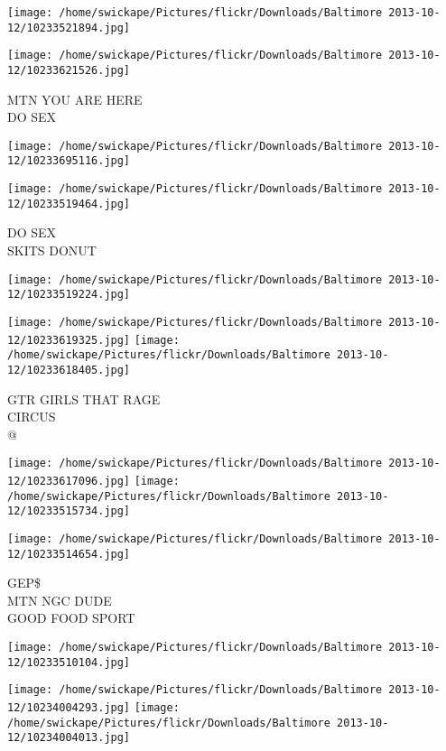 \documentclass[10pt,letterpaper]{article}
\begin{document}
\texttt{[image: /home/swickape/Pictures/flickr/Downloads/Baltimore 2013-10-12/10233521894.jpg]}

\vspace{0.25in}
\texttt{[image: /home/swickape/Pictures/flickr/Downloads/Baltimore 2013-10-12/10233621526.jpg]}

MTN YOU ARE HERE\\
DO SEX
\pagebreak

\texttt{[image: /home/swickape/Pictures/flickr/Downloads/Baltimore 2013-10-12/10233695116.jpg]}

\vspace{0.25in}
\texttt{[image: /home/swickape/Pictures/flickr/Downloads/Baltimore 2013-10-12/10233519464.jpg]}

DO SEX\\
SKITS DONUT
\pagebreak

\texttt{[image: /home/swickape/Pictures/flickr/Downloads/Baltimore 2013-10-12/10233519224.jpg]}

\vspace{0.25in}
\texttt{[image: /home/swickape/Pictures/flickr/Downloads/Baltimore 2013-10-12/10233619325.jpg]}
\texttt{[image: /home/swickape/Pictures/flickr/Downloads/Baltimore 2013-10-12/10233618405.jpg]}

GTR GIRLS THAT RAGE\\
CIRCUS\\
@
\pagebreak

\texttt{[image: /home/swickape/Pictures/flickr/Downloads/Baltimore 2013-10-12/10233617096.jpg]}
\texttt{[image: /home/swickape/Pictures/flickr/Downloads/Baltimore 2013-10-12/10233515734.jpg]}

\vspace{0.25in}
\texttt{[image: /home/swickape/Pictures/flickr/Downloads/Baltimore 2013-10-12/10233514654.jpg]}

GEP\$\\
MTN NGC DUDE\\
GOOD FOOD SPORT
\pagebreak

\texttt{[image: /home/swickape/Pictures/flickr/Downloads/Baltimore 2013-10-12/10233510104.jpg]}

\vspace{0.25in}
\texttt{[image: /home/swickape/Pictures/flickr/Downloads/Baltimore 2013-10-12/10234004293.jpg]}
\texttt{[image: /home/swickape/Pictures/flickr/Downloads/Baltimore 2013-10-12/10234004013.jpg]}
\end{document}
